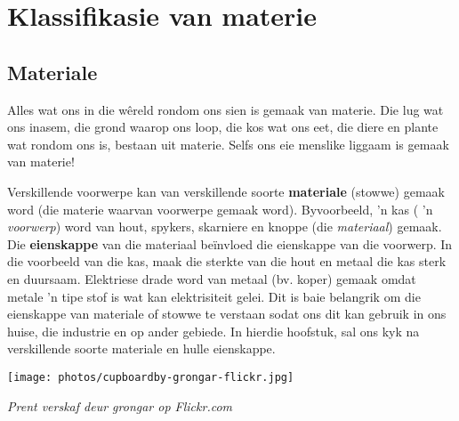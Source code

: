          \chapter{Klassifikasie van materie}\label{chap:classification}
    \setcounter{figure}{1}
    \setcounter{subfigure}{1}
    \label{m38708*cid1}
\section{Materiale}
\nopagebreak

Alles wat ons in die w\^ereld rondom ons sien is gemaak van materie. Die lug wat ons inasem, die grond waarop ons loop, die kos wat ons eet, die diere en plante wat rondom ons is, bestaan uit materie. Selfs ons eie menslike liggaam is gemaak van materie!\par 
            
\begin{minipage}{.5\textwidth}
Verskillende voorwerpe kan van verskillende soorte \textbf{materiale} (stowwe) gemaak word (die materie waarvan voorwerpe gemaak word). Byvoorbeeld, 'n kas ( 'n \textsl{voorwerp}) word van hout, spykers, skarniere en knoppe (die \textsl{materiaal}) gemaak. Die \textbf{eienskappe} van die materiaal be\"invloed die eienskappe van die voorwerp. In die voorbeeld van die kas, maak die sterkte van die hout en metaal die kas sterk en duursaam. Elektriese drade word van metaal (bv. koper) gemaak omdat metale 'n tipe stof is wat kan elektrisiteit gelei. Dit is baie belangrik om die eienskappe van materiale of stowwe te verstaan sodat ons dit kan gebruik in ons huise, die industrie en op ander gebiede. In hierdie hoofstuk, sal ons kyk na verskillende soorte materiale en hulle eienskappe.\par 
\end{minipage}
\begin{minipage}{.5\textwidth}
\begin{center}
 \texttt{[image: photos/cupboardby-grongar-flickr.jpg]}\par
\textit{Prent verskaf deur grongar op Flickr.com}
\end{center}
\end{minipage}\\\vspace{1em}


